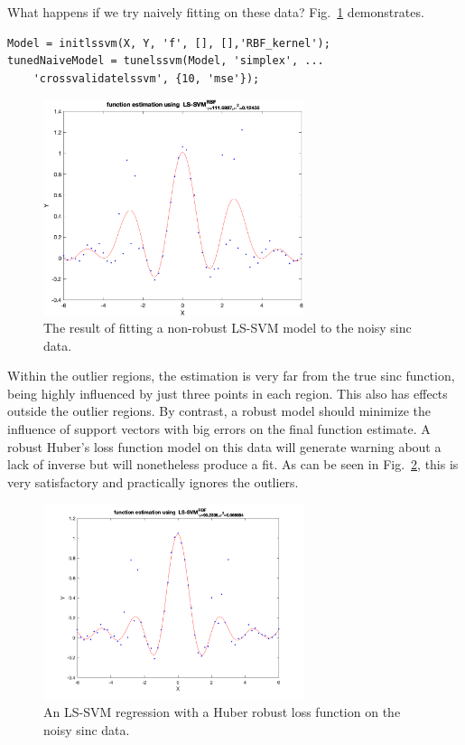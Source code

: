 \documentclass[10pt,a4paper]{article}
\begin{document}
What happens if we try naively fitting on these data? Fig.~\ref{fig:naiveNonRob} demonstrates.

\begin{lstlisting}[style=Matlab-editor]
Model = initlssvm(X, Y, 'f', [], [],'RBF_kernel');
tunedNaiveModel = tunelssvm(Model, 'simplex', ...
    'crossvalidatelssvm', {10, 'mse'});
\end{lstlisting}

\begin{figure}[h!]
  \includegraphics[width=3in]{naiveNonRob.png}
  \caption{The result of fitting a non-robust LS-SVM model to the noisy sinc data.}
  \label{fig:naiveNonRob}
\end{figure}


Within the outlier regions, the estimation is very far from the true sinc function, being highly influenced by just three points in each region. This also has effects outside the outlier regions. 
By contrast, a robust model should minimize the influence of support vectors with big errors on the final function estimate. A robust Huber's loss function model on this data will generate warning about a lack of inverse but will nonetheless produce a fit. As can be seen in Fig.~\ref{fig:whuberRobust}, this is very satisfactory and practically ignores the outliers.

\begin{figure}[h!]
  \includegraphics[width=3in]{whuberRobust.png}
  \caption{An LS-SVM regression with a Huber robust loss function on the noisy sinc data.}
  \label{fig:whuberRobust}
\end{figure}
\end{document}
